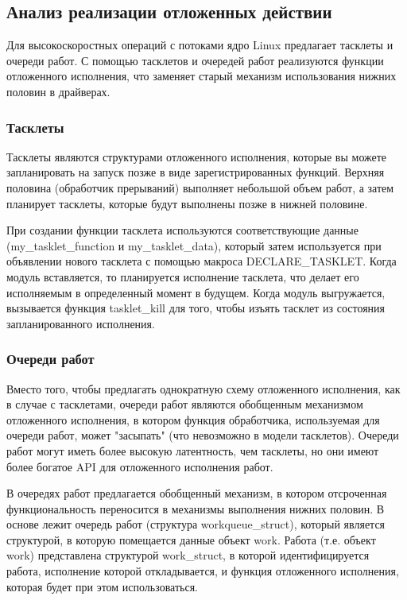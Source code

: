 \subsection{Анализ реализации отложенных действии}

Для высокоскоростных операций с потоками ядро Linux предлагает тасклеты и очереди работ. С помощью тасклетов и очередей работ реализуются функции отложенного исполнения, что заменяет старый механизм использования нижних половин в драйверах.

\subsubsection{Тасклеты}

Тасклеты являются структурами отложенного исполнения, которые вы можете запланировать на запуск позже в виде зарегистрированных функций. Верхняя половина (обработчик прерываний) выполняет небольшой объем работ, а затем планирует тасклеты, которые будут выполнены позже в нижней половине.

При создании функции тасклета используются соответствующие данные (my\_tasklet\_function и my\_tasklet\_data), который затем используется при объявлении нового тасклета с помощью макроса DECLARE\_TASKLET. Когда модуль вставляется, то планируется исполнение тасклета, что делает его исполняемым в определенный момент в будущем. Когда модуль выгружается, вызывается функция tasklet\_kill для того, чтобы изъять тасклет из состояния запланированного исполнения.

\subsubsection{Очереди работ}
Вместо того, чтобы предлагать однократную схему отложенного исполнения, как в случае с тасклетами, очереди работ являются обобщенным механизмом отложенного исполнения, в котором функция обработчика, используемая для очереди работ, может "засыпать" (что невозможно в модели тасклетов). Очереди работ могут иметь более высокую латентность, чем тасклеты, но они имеют более богатое API для отложенного исполнения работ.

В очередях работ предлагается обобщенный механизм, в котором отсроченная функциональность переносится в механизмы выполнения нижних половин. В основе лежит очередь работ (структура workqueue\_struct), который является структурой, в которую помещается данные объект work. Работа (т.е. объект work) представлена структурой work\_struct, в которой идентифицируется работа, исполнение которой откладывается, и функция отложенного исполнения, которая будет при этом использоваться.

